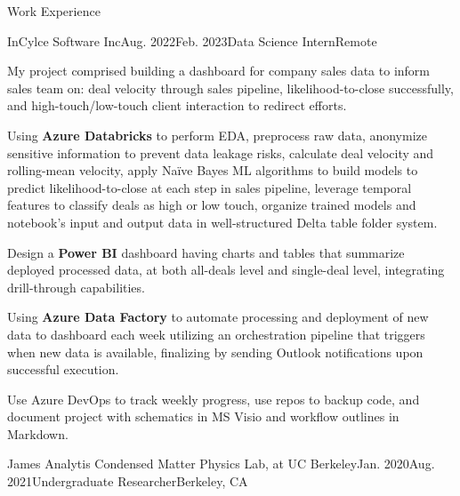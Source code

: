\documentclass{resume}
\begin{document}

\begin{Section}{Work Experience}


\begin{workSection} {InCylce Software Inc}{Aug. 2022}{Feb. 2023}{Data Science Intern}{Remote}

\item My project comprised building a dashboard for company sales data to inform sales team on: deal velocity through sales pipeline, likelihood-to-close successfully, and high-touch/low-touch client interaction to redirect efforts. 
\item Using \textbf{Azure Databricks} to perform EDA, preprocess raw data, anonymize sensitive information to prevent data leakage risks, calculate deal velocity and rolling-mean velocity, apply Naïve Bayes ML algorithms to build models to predict likelihood-to-close at each step in sales pipeline, leverage temporal features to classify deals as high or low touch, organize trained models and notebook’s input and output data in well-structured Delta table folder system. 
\item Design a \textbf{Power BI} dashboard having charts and tables that summarize deployed processed data, at both all-deals level and single-deal level, integrating drill-through capabilities. 
\item Using \textbf{Azure Data Factory} to automate processing and deployment of new data to dashboard each week utilizing an orchestration pipeline that triggers when new data is available, finalizing by sending Outlook notifications upon successful execution.
\item Use Azure DevOps to track weekly progress, use repos to backup code, and document project with schematics in MS Visio and workflow outlines in Markdown.

\end{workSection}

\begin{workSection}{James Analytis Condensed Matter Physics Lab, at UC Berkeley}{Jan. 2020}{Aug. 2021}{Undergraduate Researcher}{Berkeley, CA}


\end{workSection}
\end{Section}
\end{document}
